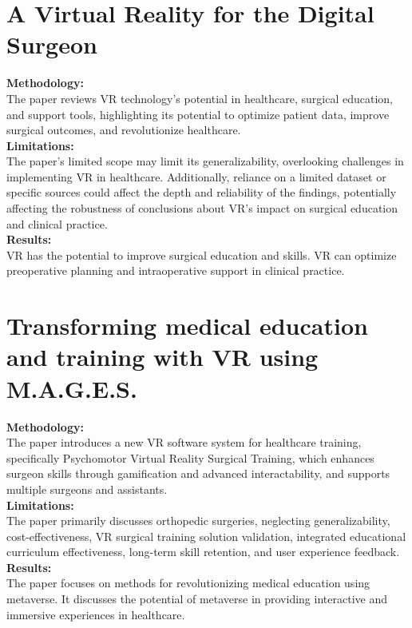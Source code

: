 \section{A Virtual Reality for the Digital Surgeon
	\cite{velazquez2021virtual}}
\textbf{Methodology:}\\The paper reviews VR technology's potential in healthcare, surgical education, and support tools, highlighting its potential to optimize patient data, improve surgical outcomes, and revolutionize healthcare.\\
\textbf{Limitations:}\\The paper's limited scope may limit its generalizability, overlooking challenges in implementing VR in healthcare. Additionally, reliance on a limited dataset or specific sources could affect the depth and reliability of the findings, potentially affecting the robustness of conclusions about VR's impact on surgical education and clinical practice.\\
\textbf{Results:}\\ VR has the potential to improve surgical education and skills.
VR can optimize preoperative planning and intraoperative support in clinical practice.
\section{Transforming medical education and training with VR using M.A.G.E.S.
	\cite{ProceedingsArticle}}
\textbf{Methodology:}\\The paper introduces a new VR software system for healthcare training, specifically Psychomotor Virtual Reality Surgical Training, which enhances surgeon skills through gamification and advanced interactability, and supports multiple surgeons and assistants.\\
\textbf{Limitations:}\\The paper primarily discusses orthopedic surgeries, neglecting generalizability, cost-effectiveness, VR surgical training solution validation, integrated educational curriculum effectiveness, long-term skill retention, and user experience feedback.\\
\textbf{Results:}\\The paper focuses on methods for revolutionizing medical education using metaverse. It discusses the potential of metaverse in providing interactive and immersive experiences in healthcare.

